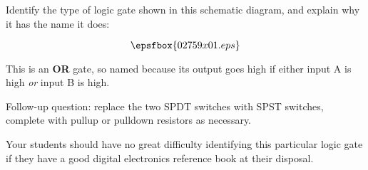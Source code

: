 

Identify the type of logic gate shown in this schematic diagram, and explain why it has the name it does:

$$\epsfbox{02759x01.eps}$$







This is an {\bf OR} gate, so named because its output goes high if either input A is high {\it or} input B is high.

\vskip 10pt

Follow-up question: replace the two SPDT switches with SPST switches, complete with pullup or pulldown resistors as necessary.







Your students should have no great difficulty identifying this particular logic gate if they have a good digital electronics reference book at their disposal.




